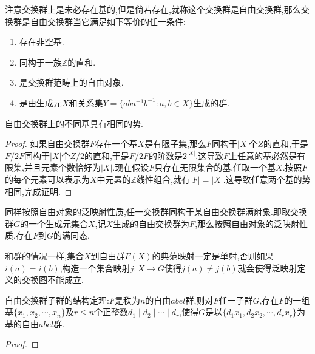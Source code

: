 \begin{enumerate}
	注意交换群上是未必存在基的,但是倘若存在,就称这个交换群是自由交换群,那么交换群是自由交换群当它满足如下等价的任一条件:
	\begin{enumerate}
		\item 存在非空基.
		\item 同构于一族$\mathbb{Z}$的直和.
		\item 是交换群范畴上的自由对象.
		\item 是由生成元$X$和关系集$Y=\{aba^{-1}b^{-1}:a,b\in X\}$生成的群.
	\end{enumerate}
	
	自由交换群上的不同基具有相同的势.
	\begin{proof}
		
		如果自由交换群$F$存在一个基$X$是有限子集,那么$F$同构于$|X|$个$Z$的直和,于是$F/2F$同构于$|X|$个$Z/2$的直和,于是$F/2F$的阶数是$2^{|X|}$.这导致$F$上任意的基必然是有限集,并且元素个数恰好为$|X|$.现在假设$F$只存在无限集合的基,任取一个基$X$.按照$F$的每个元素可以表示为$X$中元素的$\mathbb{Z}$线性组合,就有$|F|=|X|$.这导致任意两个基的势相同,完成证明.
	\end{proof}
	
	同样按照自由对象的泛映射性质,任一交换群同构于某自由交换群满射象.即取交换群$G$的一个生成元集合$X$,记$X$生成的自由交换群为$F$,那么按照自由对象的泛映射性质,存在$F$到$G$的满同态.
	
	和群的情况一样,集合$X$到自由群$F(X)$的典范映射一定是单射,否则如果$i(a)=i(b)$,构造一个集合映射$j:X\to G$使得$j(a)\not=j(b)$就会使得泛映射定义的交换图不能成立.
	
	自由交换群子群的结构定理:$F$是秩为$n$的自由$abel$群,则对$F$任一子群$G$,存在$F$的一组基$\{x_1,x_2,\cdots,x_n\}$及$r\le n$个正整数$d_1\mid d_2\mid\cdots\mid d_r$,使得$G$是以$\{d_1x_1,d_2x_2,\cdots,d_rx_r\}$为基的自由$abel$群.
	\begin{proof}
		

\end{proof}
\end{enumerate}

